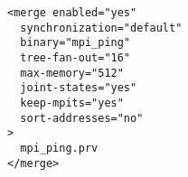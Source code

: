 \begin{verbatim}
<merge enabled="yes" 
  synchronization="default"
  binary="mpi_ping"
  tree-fan-out="16"
  max-memory="512"
  joint-states="yes"
  keep-mpits="yes"
  sort-addresses="no"
>
  mpi_ping.prv 
</merge>
\end{verbatim}
